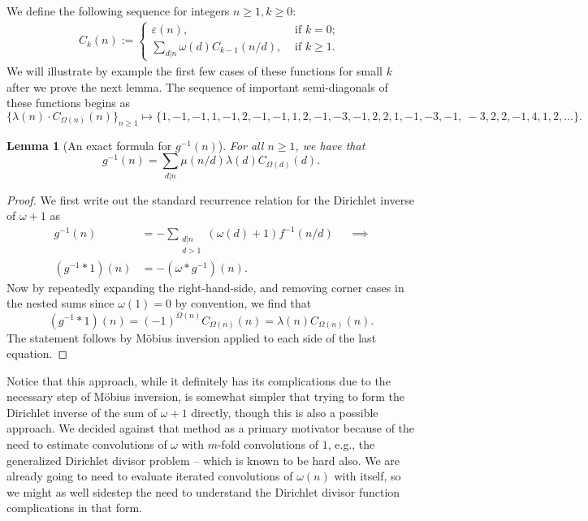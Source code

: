 \documentclass[11pt,reqno,a4letter]{article}
\numberwithin{figure}{section}
\numberwithin{table}{section}
\newcommand{\seqnum}[1]{\href{http://oeis.org/#1}{\color{ProcessBlue}{\underline{#1}}}}
\theoremstyle{plain}
\newtheorem{lemma}[theorem]{Lemma}
\numberwithin{theorem}{section}
\theoremstyle{definition}
\begin{document}
We define the following sequence for integers $n \geq 1, k \geq 0$: 
\begin{align} 
C_k(n) := \begin{cases} 
     \varepsilon(n), & \text{ if $k = 0$; } \\ 
     \sum\limits_{d|n} \omega(d) C_{k-1}(n/d), & \text{ if $k \geq 1$. } 
     \end{cases} 
\end{align} 
We will illustrate by example the first few cases of these functions for small $k$ after we prove 
the next lemma. 
The sequence of important semi-diagonals of these functions begins as 
\cite[\seqnum{A008480}]{OEIS} 
\[
\{\lambda(n) \cdot C_{\Omega(n)}(n) \}_{n \geq 1} \mapsto \{
     1, -1, -1, 1, -1, 2, -1, -1, 1, 2, -1, -3, -1, 2, 2, 1, -1, -3, -1, \
     -3, 2, 2, -1, 4, 1, 2, \ldots \}. 
\]

\begin{lemma}[An exact formula for $g^{-1}(n)$] 
\label{lemma_AnExactFormulaFor_gInvByMobiusInv_v1} 
For all $n \geq 1$, we have that 
\[
g^{-1}(n) = \sum_{d|n} \mu(n/d) \lambda(d) C_{\Omega(d)}(d). 
\]
\end{lemma}
\begin{proof} 
We first write out the standard recurrence relation for the Dirichlet inverse of 
$\omega+1$ as 
\begin{align*} 
g^{-1}(n) & = - \sum_{\substack{d|n \\ d>1}} (\omega(d) + 1) f^{-1}(n/d) && \implies \\ 
     (g^{-1} \ast 1)(n) & = -(\omega \ast g^{-1})(n). 
\end{align*} 
Now by repeatedly expanding the right-hand-side, and removing corner cases in the nested sums since 
$\omega(1) = 0$ by convention, we find that 
\[
(g^{-1} \ast 1)(n) = (-1)^{\Omega(n)} C_{\Omega(n)}(n) = \lambda(n) C_{\Omega(n)}(n). 
\]
The statement follows by M\"obius inversion applied to each side of the last equation. 
\end{proof}

Notice that this approach, while it definitely has its complications due to the necessary step of 
M\"obius inversion, is somewhat simpler that trying to form the Dirichlet inverse of the sum of 
$\omega+1$ directly, though this is also a possible approach. We decided against that method as a 
primary motivator because of the need to estimate convolutions of $\omega$ with $m$-fold convolutions 
of $1$, e.g., the generalized Dirichlet divisor problem -- which is known to be hard also. 
We are already going to need to evaluate iterated convolutions of $\omega(n)$ with itself, so we might 
as well sidestep the need to understand the Dirichlet divisor function complications in that form. 
\end{document}

